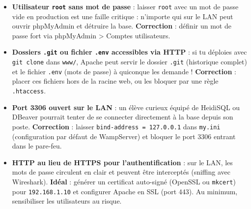 \documentclass[11pt]{article}
\begin{document}
\begin{attention}
\begin{itemize}
    \item \textbf{Utilisateur \texttt{root} sans mot de passe} : laisser \texttt{root} avec un mot de passe vide en production est une faille critique : n'importe qui sur le LAN peut ouvrir phpMyAdmin et détruire la base. \textbf{Correction} : définir un mot de passe fort via phpMyAdmin \textgreater{} Comptes utilisateurs.
    \item \textbf{Dossiers \texttt{.git} ou fichier \texttt{.env} accessibles via HTTP} : si tu déploies avec \texttt{git clone} dans \texttt{www/}, Apache peut servir le dossier \texttt{.git} (historique complet) et le fichier \texttt{.env} (mots de passe) à quiconque les demande ! \textbf{Correction} : placer ces fichiers hors de la racine web, ou les bloquer par une règle \texttt{.htaccess}.
    \item \textbf{Port 3306 ouvert sur le LAN} : un élève curieux équipé de HeidiSQL ou DBeaver pourrait tenter de se connecter directement à la base depuis son poste. \textbf{Correction} : laisser \texttt{bind-address = 127.0.0.1} dans \texttt{my.ini} (configuration par défaut de WampServer) et bloquer le port 3306 entrant dans le pare-feu.
    \item \textbf{HTTP au lieu de HTTPS pour l'authentification} : sur le LAN, les mots de passe circulent en clair et peuvent être interceptés (sniffing avec Wireshark). \textbf{Idéal} : générer un certificat auto-signé (OpenSSL ou \texttt{mkcert}) pour \texttt{192.168.1.10} et configurer Apache en SSL (port 443). Au minimum, sensibiliser les utilisateurs au risque.
\end{itemize}
\end{attention}
\end{document}
